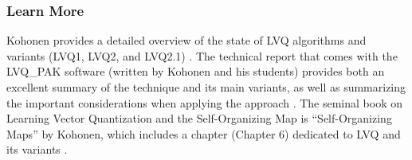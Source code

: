 % 
% 
\subsubsection{Learn More}
Kohonen provides a detailed overview of the state of LVQ algorithms and variants (LVQ1, LVQ2, and LVQ2.1) \cite{Kohonen1990}. The technical report that comes with the LVQ\_PAK software (written by Kohonen and his students) provides both an excellent summary of the technique and its main variants, as well as summarizing the important considerations when applying the approach \cite{Kohonen1996}.
The seminal book on Learning Vector Quantization and the Self-Organizing Map is ``Self-Organizing Maps'' by Kohonen, which includes a chapter (Chapter 6) dedicated to LVQ and its variants \cite{Kohonen1995}.


